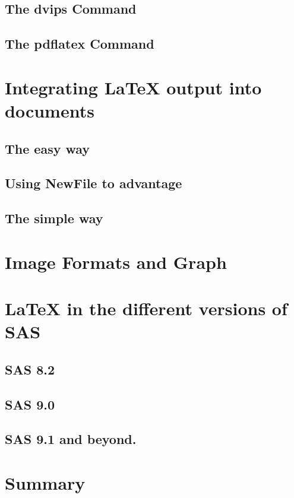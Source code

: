 \documentclass{book}
\begin{document}
\subsection{The dvips Command}

\subsection{The pdflatex Command}

\section{Integrating LaTeX output into documents}

\subsection{The easy way}

\subsection{Using NewFile to advantage}

\subsection{The simple way}

\section{Image Formats and Graph}

\section{LaTeX in the different versions of SAS}

\subsection{SAS 8.2}

\subsection{SAS 9.0}

\subsection{SAS 9.1 and beyond.}

\section{Summary}
\end{document}
